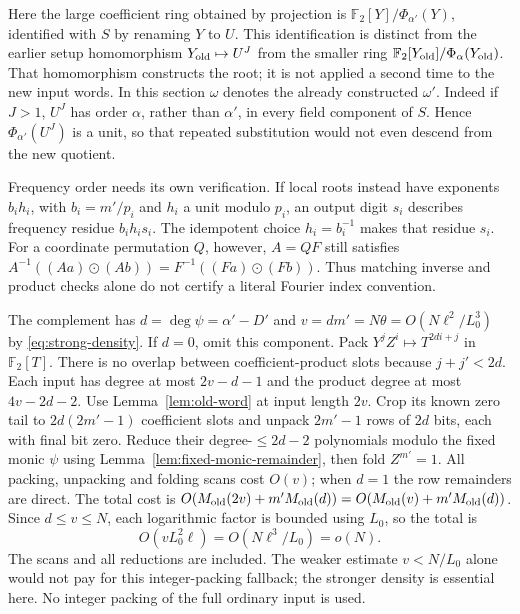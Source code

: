 \documentclass[11pt]{article}
\newcommand{\F}{\mathbb F}
\begin{document}
Here the large coefficient ring obtained by projection is
$\F_2[Y]/\Phi_{\alpha'}(Y)$, identified with $S$ by renaming $Y$ to $U$.
This identification is distinct from the earlier setup homomorphism
$Y_{\rm old}\mapsto U^J$ from the smaller ring
$\F_2[Y_{\rm old}]/\Phi_\alpha(Y_{\rm old})$. That homomorphism constructs
the root; it is not applied a second time to the new input words.
In this section $\omega$ denotes the already constructed $\omega'$.
Indeed if $J>1$, $U^J$ has order $\alpha$, rather than $\alpha'$,
in every field component of $S$. Hence $\Phi_{\alpha'}(U^J)$ is a
unit, so that repeated substitution would not even descend from the
new quotient.

Frequency order needs its own verification. If local roots instead have
exponents $b_i h_i$, with $b_i=m'/p_i$ and $h_i$ a unit modulo $p_i$,
an output digit $s_i$ describes frequency residue $b_i h_i s_i$.
The idempotent choice $h_i=b_i^{-1}$ makes that residue $s_i$.
For a coordinate permutation $Q$, however, $A=QF$ still satisfies
$A^{-1}((Aa)\odot(Ab))=F^{-1}((Fa)\odot(Fb))$.
Thus matching inverse and product checks alone do not certify a
literal Fourier index convention.

The complement has $d=\deg\psi=\alpha'-D'$ and
$v=dm'=N\theta=O(N\ell^2/L_0^3)$ by \eqref{eq:strong-density}.
If $d=0$, omit this component.
Pack $Y^jZ^i\mapsto T^{2di+j}$ in $\F_2[T]$. There is no overlap
between coefficient-product slots because $j+j'<2d$.
Each input has degree at most $2v-d-1$ and the product degree at most
$4v-2d-2$. Use Lemma~\ref{lem:old-word} at input length $2v$.
Crop its known zero tail to $2d(2m'-1)$ coefficient slots and unpack
$2m'-1$ rows of $2d$ bits, each with final bit zero.
Reduce their degree-$\le2d-2$ polynomials modulo the fixed monic
$\psi$ using Lemma~\ref{lem:fixed-monic-remainder}, then fold
$Z^{m'}=1$. All packing, unpacking and folding scans cost $O(v)$;
when $d=1$ the row remainders are direct.
The total cost is
$O(M_{\rm old}(2v)+m'M_{\rm old}(d))
 =O(M_{\rm old}(v)+m'M_{\rm old}(d))$. Since
$d\le v\le N$, each logarithmic factor is bounded using $L_0$,
so the total is
\[
 O(vL_0^2\ell)=O(N\ell^3/L_0)=o(N).
\]
The scans and all reductions are included. The weaker estimate
$v<N/L_0$ alone would not pay for this integer-packing fallback;
the stronger density is essential here. No integer packing of the
full ordinary input is used.
\end{document}

